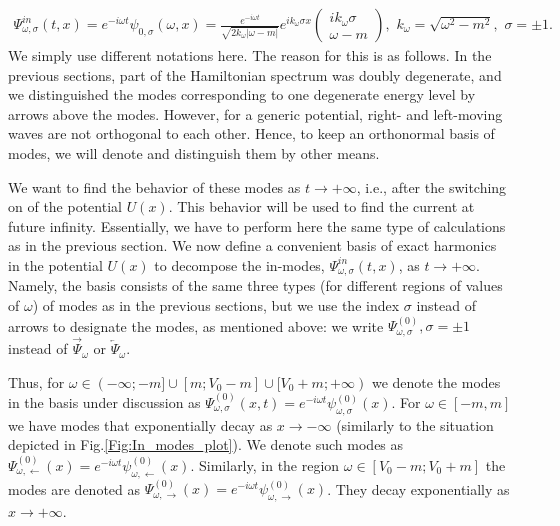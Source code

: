 \documentclass[12pt]{article}
\numberwithin{equation}{section}
\begin{document}
\begin{gather}\label{Lap1}
\mathit{\Psi}^{in}_{\omega,\sigma}(t,x)= e^{-i\omega t} \psi_{0,\sigma}(\omega, x) = \frac{e^{-i\omega t}}{\sqrt{2k_\omega |\omega-m|}}e^{i k_\omega\sigma x}\begin{pmatrix}
		ik_\omega\sigma\\
		\omega-m
	\end{pmatrix}, \,\, k_\omega = \sqrt{\omega^2-m^2}, \,\, \sigma=\pm1.
\end{gather}
We simply use different notations here.
The reason for this is as follows. In the previous sections, part of the Hamiltonian spectrum was doubly degenerate, and we distinguished the modes corresponding to one degenerate energy level by arrows above the modes. However, for a generic potential, right- and left-moving waves are not orthogonal to each other. Hence, to keep an orthonormal basis of modes, we will denote and distinguish them by other means.

We want to find the behavior of these modes as $t \to +\infty$, i.e., after the switching on of the potential $U(x)$. This behavior will be used to find the current at future infinity. Essentially, we have to perform here the same type of calculations as in the previous section. We now define a convenient basis of exact harmonics in the potential $U(x)$ to decompose the in-modes, $\mathit{\Psi}^{in}_{\omega,\sigma}(t,x)$, as $t \to +\infty$. Namely, the basis consists of the same three types (for different regions of values of $\omega$) of modes as in the previous sections, but we use the index $\sigma$ instead of arrows to designate the modes, as mentioned above: we write $\mathit{\Psi}^{(0)}_{\omega,\sigma},\sigma=\pm1$ instead of $\overrightarrow{\mathit{\Psi}}_{\omega}$ or $\overleftarrow{\mathit{\Psi}}_{\omega}$. 

Thus, for $\omega\in(-\infty;-m]\cup[m;V_0-m]\cup[V_0+m;+\infty)$ we denote the modes in the basis under discussion as $\mathit{\Psi}^{(0)}_{\omega,\sigma}(x,t) = e^{-i\omega t} \psi^{(0)}_{\omega, \sigma}(x)$. For $\omega\in[-m,m]$ we have modes that exponentially decay as $x\to -\infty$ (similarly to the situation depicted in Fig.\ref{Fig:In_modes_plot}). We denote such modes as $\mathit{\Psi}^{(0)}_{\omega,\leftarrow}(x) = e^{-i\omega t} \psi^{(0)}_{\omega, \leftarrow}(x)$. Similarly, in the region $\omega\in[V_0-m;V_0+m]$ the modes are denoted as $\mathit{\Psi}^{(0)}_{\omega,\rightarrow}(x) = e^{-i\omega t} \psi^{(0)}_{\omega, \rightarrow}(x)$. They decay exponentially as $x\to +\infty$.
\end{document}
